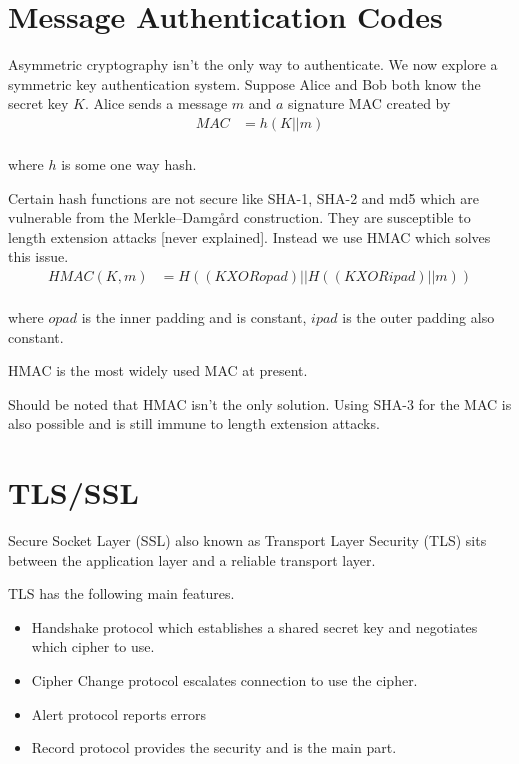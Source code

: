 \documentclass{report}
\begin{document}
\section{Message Authentication Codes}
Asymmetric cryptography isn't the only way to authenticate. We now explore a
symmetric key authentication system.
Suppose Alice and Bob both know the secret key $K$.
Alice sends a message $m$ and $a$
signature MAC created by
\begin{align*}
    MAC &= h(K || m) \\
\end{align*}

where $h$ is some one way hash.

Certain hash functions are not secure like SHA-1, SHA-2 and md5 which are
vulnerable from the Merkle–Damgård construction. They are susceptible to
length extension attacks [never explained].
Instead we use HMAC which solves this issue.
\begin{align*}
    HMAC(K,m) &= H\left((K XOR opad) || H((K XOR ipad) || m)\right) \\
\end{align*}

where $opad$ is the inner padding and is constant,
$ipad$ is the outer padding also constant.

HMAC is the most widely used MAC at present.

Should be noted that HMAC isn't the only solution. Using SHA-3 for the MAC is
also possible and is still immune to length extension attacks.

\section{TLS/SSL}
Secure Socket Layer (SSL) also known as Transport Layer Security (TLS)
sits between the application layer and a reliable transport layer.

TLS has the following main features.
\begin{itemize}
    \item Handshake protocol which establishes
        a shared secret key and negotiates which
        cipher to use.
    \item Cipher Change protocol escalates connection to use the cipher.
    \item Alert protocol reports errors
    \item Record protocol provides the security and is the main part.
\end{itemize}
\end{document}
